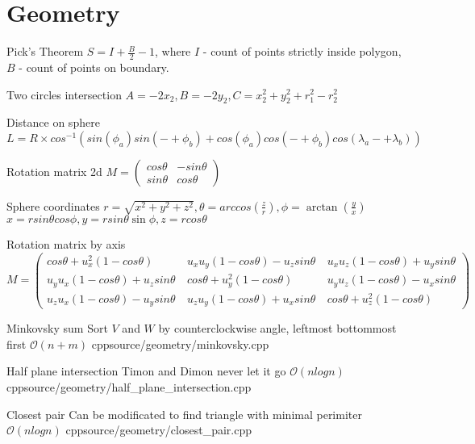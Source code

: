 \documentclass[landscape, 10pt, a4paper, oneside, twocolumn]{extarticle}
\begin{document}
\section{Geometry}

\Formula
{Pick's Theorem}
{$S = I + \frac{B}{2} - 1$, where $I$ - count of points strictly inside polygon, $B$ - count of points on boundary.}

\Formula
{Two circles intersection}
{$A = -2 x_{2}, B = - 2 y_{2}, C = x_{2}^{2} + y_{2}^{2} + r_{1}^{2} - r_{2}^{2}$}

\Formula
{Distance on sphere}
{$L = R \times cos^{-1}( sin(\phi_{a}) sin(-+ \phi_{b}) + cos(\phi_{a}) cos(-+ \phi_{b}) cos(\lambda_{a} -+ \lambda_{b}) ) $}

\Formula
{Rotation matrix 2d}
{$M = \left( \begin{smallmatrix} cos\theta & - sin\theta \\ sin\theta & cos\theta \end{smallmatrix} \right)$}

\Formula
{Sphere coordinates}
{
    $r = \sqrt{x^{2} + y^{2} + z^{2}}, \theta = arccos(\frac{z}{r}), \phi = \arctan(\frac{y}{x})$ \\
    $x = r sin \theta cos \phi, y = r sin \theta \sin \phi, z = r cos \theta$ \\ 
}

\Formula
{Rotation matrix by axis}
{ $ M = 
	\left ( 
		\begin{smallmatrix} 
			cos\theta + u_{x}^{2} (1 - cos\theta) \  & u_{x} u_{y} (1 - cos\theta) - u_{z} sin\theta \ & u_{x} u_{z} (1 - cos\theta) + u_{y} sin\theta \\ 
			u_{y} u_{x} (1 - cos\theta) + u_{z} sin\theta \ & cos\theta + u_{y}^{2} (1 - cos\theta) \ & u_{y} u_{z} (1 - cos\theta) - u_{x} sin\theta \\ 
			u_{z} u_{x} (1 - cos\theta) - u_{y} sin\theta \ & u_{z} u_{y} (1 - cos\theta) + u_{x} sin\theta \ & cos\theta + u_{z}^{2} (1 - cos\theta)
		\end{smallmatrix} 
	\right ) $
}

\Algorithm
{Minkovsky sum}
{Sort $V$ and $W$ by counterclockwise angle, leftmost bottommost first}
{$\mathcal{O}(n + m)$}
{cpp}{source/geometry/minkovsky.cpp}

\Algorithm
{Half plane intersection}
{Timon and Dimon never let it go}
{$\mathcal{O}(n logn)$}
{cpp}{source/geometry/half_plane_intersection.cpp}

\Algorithm
{Closest pair}
{Can be modificated to find triangle with minimal perimiter}
{$\mathcal{O}(n logn)$}
{cpp}{source/geometry/closest_pair.cpp}
\end{document}
